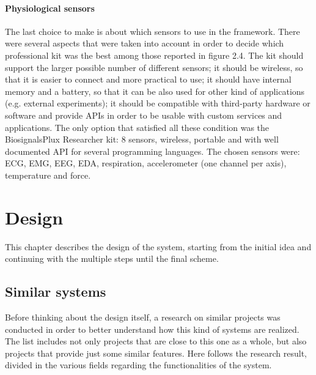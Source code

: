 \documentclass[binding=0.6cm,LaM]{sapthesis}
\begin{document}
\subsubsection{Physiological sensors}
The last choice to make is about which sensors to use in the framework.
There were several aspects that were taken into account in order to decide which professional kit was the best among those reported in figure 2.4. The kit should support the larger possible number of different sensors; it should be wireless, so that it is easier to connect and more practical to use; it should have internal memory and a battery, so that it can be also used for other kind of applications (e.g. external experiments); it should be compatible with third-party hardware or software and provide APIs in order to be usable with custom services and applications. The only option that satisfied all these condition was the BiosignalsPlux Researcher kit: 8 sensors, wireless, portable and with well documented API for several programming languages. The chosen sensors were: ECG, EMG, EEG, EDA, respiration, accelerometer (one channel per axis), temperature and force.


\chapter{Design}
This chapter describes the design of the system, starting from the initial idea and continuing with the multiple steps until the final scheme.

\section{Similar systems}
Before thinking about the design itself, a research on similar projects was conducted in order to better understand how this kind of systems are realized. The list includes not only projects that are close to this one as a whole, but also projects that provide just some similar features. Here follows the research result, divided in the various fields regarding the functionalities of the system. 
\end{document}
